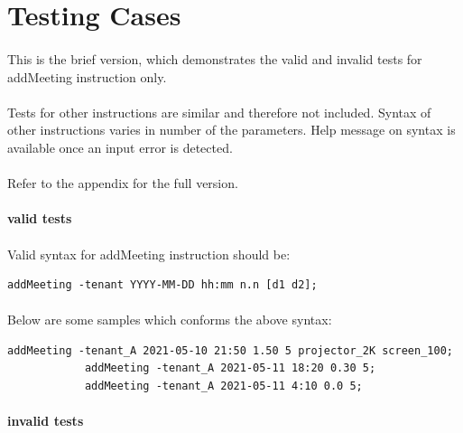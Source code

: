 \documentclass{article}
\begin{document}
    \cleardoublepage
    \section{Testing Cases}
        \paragraph{}
        This is the brief version, which demonstrates the valid and invalid tests for addMeeting instruction only.
        \paragraph{}
        Tests for other instructions are similar and therefore not included. Syntax of other instructions varies in
        number of the parameters. Help message on syntax is available once an input error is detected.
        \paragraph{}
        Refer to the appendix for the full version. 

        \paragraph{valid tests}
        \paragraph{}
        Valid syntax for addMeeting instruction should be:
        \begin{Verbatim}[gobble=8]
            addMeeting -tenant YYYY-MM-DD hh:mm n.n [d1 d2]; 
        \end{Verbatim}
        \paragraph{}
        Below are some samples which conforms the above syntax:
        \begin{Verbatim}[gobble=8]
            addMeeting -tenant_A 2021-05-10 21:50 1.50 5 projector_2K screen_100;
            addMeeting -tenant_A 2021-05-11 18:20 0.30 5;
            addMeeting -tenant_A 2021-05-11 4:10 0.0 5;
        \end{Verbatim}
        
        
        \paragraph{invalid tests}
\end{document}
